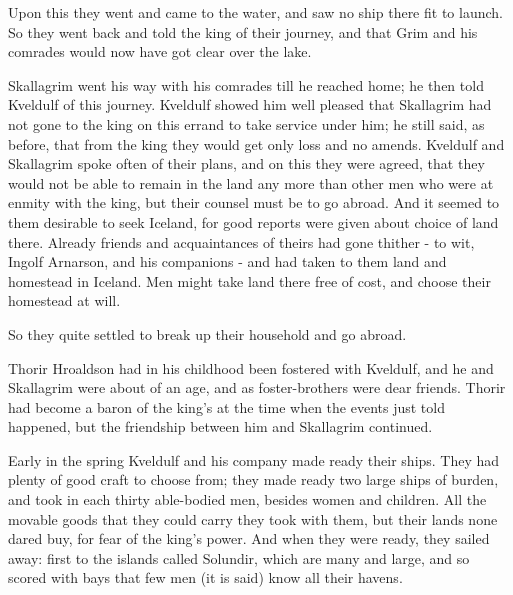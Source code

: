 Upon this they went and came to the water, and saw no ship there fit to launch. So they went back and told the king of their journey, and that Grim and his comrades would now have got clear over the lake.

Skallagrim went his way with his comrades till he reached home; he then told Kveldulf of this journey. Kveldulf showed him well pleased that Skallagrim had not gone to the king on this errand to take service under him; he still said, as before, that from the king they would get only loss and no amends. Kveldulf and Skallagrim spoke often of their plans, and on this they were agreed, that they would not be able to remain in the land any more than other men who were at enmity with the king, but their counsel must be to go abroad. And it seemed to them desirable to seek Iceland, for good reports were given about choice of land there. Already friends and acquaintances of theirs had gone thither - to wit, Ingolf Arnarson, and his companions - and had taken to them land and homestead in Iceland. Men might take land there free of cost, and choose their homestead at will.

So they quite settled to break up their household and go abroad.

Thorir Hroaldson had in his childhood been fostered with Kveldulf, and he and Skallagrim were about of an age, and as foster-brothers were dear friends. Thorir had become a baron of the king's at the time when the events just told happened, but the friendship between him and Skallagrim continued.

Early in the spring Kveldulf and his company made ready their ships. They had plenty of good craft to choose from; they made ready two large ships of burden, and took in each thirty able-bodied men, besides women and children. All the movable goods that they could carry they took with them, but their lands none dared buy, for fear of the king's power. And when they were ready, they sailed away: first to the islands called Solundir, which are many and large, and so scored with bays that few men (it is said) know all their havens.
